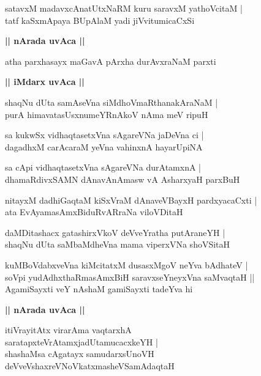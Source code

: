 \documentclass[twoside,12pt,openright]{book}
\newcounter{shloka}[chapter]
\def\uvaca#1{\centerline{{\large\textbf{#1}}}}
\begin{document}
\begin{shloka}%
satavxM madavxcAnatUtxNaRM kuru saravxM yathoVcitaM |\\
tatf kaSxmApaya BUpAlaM yadi jiVvitumicaCxSi
\end{shloka}

\uvaca{|| nArada uvAca ||}

\begin{shloka}%
atha parxhasayx maGavA pArxha durAvxraNaM parxti
\end{shloka}
\uvaca{ || iMdarx uvAca ||}

\begin{shloka}%
shaqNu dUta samAseVna siMdhoVmaRthanakAraNaM |\\
purA himavatasUsxnumeYRnAkoV nAma meV ripuH 
\end{shloka}

\begin{shloka}%
sa kukwSx vidhaqtasetxVna sAgareVNa jaDeVna ci |\\
dagadhxM carAcaraM yeVna vahinxnA hayarUpiNA
\end{shloka}

\begin{shloka}%
sa cApi vidhaqtasetxVna sAgareVNa durAtamxnA |\\
dhamaRdivxSAMN dAnavAnAmasw vA AsharxyaH parxBuH 
\end{shloka}

\begin{shloka}%
nitayxM dadhiGaqtaM kiSxVraM dAnaveVBayxH pardxyacaCxti |\\
ata EvAyamasAmxBiduRvARraNa viloVDitaH
\end{shloka}

\begin{shloka}%
daMDitashacx gatashirxVkoV deVveYratha putAraneYH |\\
shaqNu dUta saMbaMdheVna mama viperxVNa shoVSitaH 
\end{shloka}

\begin{shloka}%
kuMBoVdabxveVna kiMcitatxM dusasxMgoV neYva bAdhateV |\\
soVpi yudAdhxthaRmasAmxBiH saravxseYneyxVna saMvaqtaH ||\\
AgamiSayxti veY nAshaM gamiSayxti tadeYva hi 
\end{shloka}

\uvaca{|| nArada uvAca ||}

\begin{shloka}%
itiVrayitAtx virarAma vaqtarxhA \\
saratapxteVrAtamxjadUtamucacxkeYH |\\
shashaMsa cAgatayx samudarxsUnoVH \\
deVveVshaxreVNoVkatxmasheVSamAdaqtaH
\end{shloka}
\end{document}
